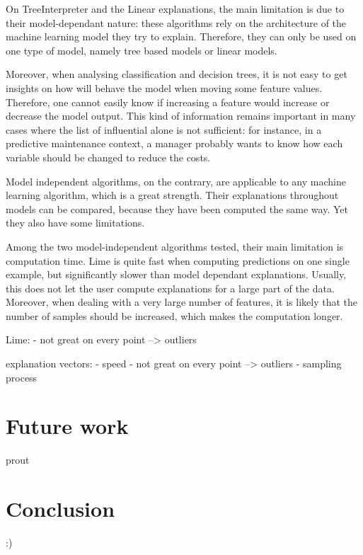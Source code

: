 \documentclass[a4paper,11pt]{kth-mag}
\begin{document}
\vspace{1em}

On TreeInterpreter and the Linear explanations, the main limitation is due to their model-dependant nature: these algorithms rely on the architecture of the machine learning model they try to explain. Therefore, they can only be used on one type of model, namely tree based models or linear models.

Moreover, when analysing classification and decision trees, it is not easy to get insights on how will behave the model when moving some feature values. Therefore, one cannot easily know if increasing a feature would increase or decrease the model output. This kind of information remains important in many cases where the list of influential alone is not sufficient: for instance, in a predictive maintenance context, a manager probably wants to know how each variable should be changed to reduce the costs.

\vspace{1em}

Model independent algorithms, on the contrary, are applicable to any machine learning algorithm, which is a great strength. Their explanations throughout models can be compared, because they have been computed the same way. Yet they also have some limitations.

Among the two model-independent algorithms tested, their main limitation is computation time. Lime is quite fast when computing predictions on one single example, but significantly slower than model dependant explanations. Usually, this does not let the user compute explanations for a large part of the data. Moreover, when dealing with a very large number of features, it is likely that the number of samples should be increased, which makes the computation longer.

Lime:
- not great on every point --> outliers

explanation vectors:
- speed
- not great on every point --> outliers
- sampling process

\section{Future work}

prout

\section{Conclusion}

:)


\nocite{mythos}
\nocite{euregulation}
\nocite{healthcare}
\nocite{trust}
\nocite{explainingclassif}
\nocite{evolutionnary}
\nocite{breastcancer}
\nocite{sensitivity}

\printbibliography
\end{document}
